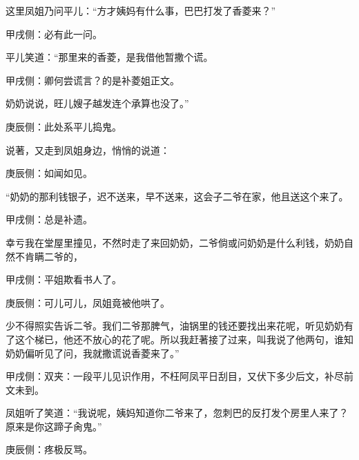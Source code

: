 \begin{parag}
    这里凤姐乃问平儿：“方才姨妈有什么事，巴巴打发了香菱来？”\begin{note}甲戌侧：必有此一问。\end{note}平儿笑道：“那里来的香菱，是我借他暂撒个谎。\begin{note}甲戌侧：卿何尝谎言？的是补菱姐正文。\end{note}奶奶说说，旺儿嫂子越发连个承算也没了。”\begin{note}庚辰侧：此处系平儿捣鬼。\end{note}说著，又走到凤姐身边，悄悄的说道：\begin{note}庚辰侧：如闻如见。\end{note}“奶奶的那利钱银子，迟不送来，早不送来，这会子二爷在家，他且送这个来了。\begin{note}甲戌侧：总是补遗。\end{note}幸亏我在堂屋里撞见，不然时走了来回奶奶，二爷倘或问奶奶是什么利钱，奶奶自然不肯瞒二爷的，\begin{note}甲戌侧：平姐欺看书人了。\end{note}\begin{note}庚辰侧：可儿可儿，凤姐竟被他哄了。\end{note}少不得照实告诉二爷。我们二爷那脾气，油锅里的钱还要找出来花呢，听见奶奶有了这个梯已，他还不放心的花了呢。所以我赶著接了过来，叫我说了他两句，谁知奶奶偏听见了问，我就撒谎说香菱来了。”\begin{note}甲戌侧：双夹：一段平儿见识作用，不枉阿凤平日刮目，又伏下多少后文，补尽前文未到。\end{note}凤姐听了笑道：“我说呢，姨妈知道你二爷来了，忽刺巴的反打发个房里人来了？原来是你这蹄子肏鬼。”\begin{note}庚辰侧：疼极反骂。\end{note}
\end{parag}


